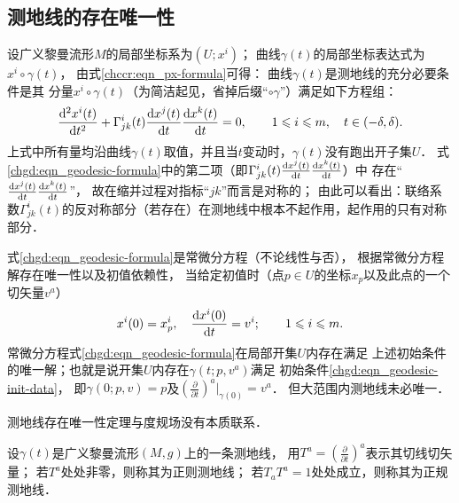 \subsection{测地线的存在唯一性}
设广义黎曼流形$M$的局部坐标系为$(U;x^i)$；
曲线$\gamma(t)$的局部坐标表达式为$x^i\circ\gamma(t)$，
由式\eqref{chccr:eqn_px-formula}可得：
曲线$\gamma(t)$是测地线的充分必要条件是其
分量$x^i\circ\gamma(t)$（为简洁起见，省掉后缀“$\circ\gamma$”）满足如下方程组：
\begin{equation}\label{chgd:eqn_geodesic-formula}
    \frac{{\rm d}^2 x^i(t)}{{\rm d}t^2} + \Gamma_{jk}^i(t)
    \frac{{\rm d}x^j(t)}{{\rm d} t} \frac{{\rm d}x^k(t)}{{\rm d} t} =0,
    \qquad 1 \leqslant i \leqslant m , \quad t\in (-\delta,\delta).
\end{equation}
上式中所有量均沿曲线$\gamma(t)$取值，并且当$t$变动时，$\gamma(t)$没有跑出开子集$U$．
式\eqref{chgd:eqn_geodesic-formula}中的第二项（即$\Gamma_{jk}^i(t)
\frac{{\rm d}x^j(t)}{{\rm d} t} \frac{{\rm d}x^k(t)}{{\rm d} t}$）中
存在“$\frac{{\rm d}x^j(t)}{{\rm d} t} \frac{{\rm d}x^k(t)}{{\rm d} t}$”，
故在缩并过程对指标“$jk$”而言是对称的；
由此可以看出：联络系数$\Gamma_{jk}^i(t)$的反对称部分（若存在）在测地线中根本不起作用，起作用的只有对称部分．




式\eqref{chgd:eqn_geodesic-formula}是常微分方程（不论线性与否），
根据常微分方程解存在唯一性以及初值依赖性，
当给定初值时（点$p\in U$的坐标$x_p$以及此点的一个切矢量$v^a$）
\begin{equation}\label{chgd:eqn_geodesic-init-data}
    x^i(0) = x^i_p, \quad \frac{{\rm d}x^i(0)}{{\rm d}t}=v^i;
    \qquad 1 \leqslant i \leqslant m.
\end{equation}
常微分方程式\eqref{chgd:eqn_geodesic-formula}在局部开集$U$内存在满足
上述初始条件的唯一解；也就是说开集$U$内存在$\gamma(t;p,v^a)$满足
初始条件\eqref{chgd:eqn_geodesic-init-data}，
即$\gamma(0;p,v)=p$及$(\frac{\partial}{\partial t})^a|_{\gamma(0)}=v^a$．
但大范围内测地线未必唯一．



测地线存在唯一性定理与度规场没有本质联系．

\begin{definition}
    设$\gamma(t)$是广义黎曼流形$(M,g)$上的一条测地线，
    用$T^a=(\frac{\partial}{\partial t})^a$表示其切线切矢量；
    若$T^a$处处非零，则称其为{\heiti 正则测地线}；
    若$T_a T^a=1$处处成立，则称其为{\heiti 正规测地线}．
\end{definition}



